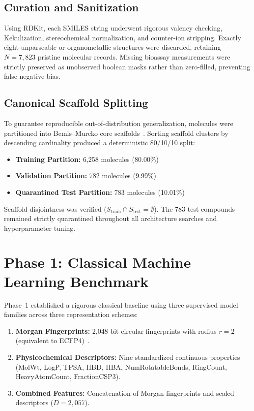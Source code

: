 \documentclass[conference]{IEEEtran}
\begin{document}
\subsection{Curation and Sanitization}
Using RDKit, each SMILES string underwent rigorous valency checking, Kekulization, stereochemical normalization, and counter-ion stripping. Exactly eight unparseable or organometallic structures were discarded, retaining $N = 7,823$ pristine molecular records. Missing bioassay measurements were strictly preserved as unobserved boolean masks rather than zero-filled, preventing false negative bias.

\subsection{Canonical Scaffold Splitting}
To guarantee reproducible out-of-distribution generalization, molecules were partitioned into Bemis--Murcko core scaffolds~\cite{bemis1996frameworks}. Sorting scaffold clusters by descending cardinality produced a deterministic 80/10/10 split:
\begin{itemize}
    \item \textbf{Training Partition:} 6,258 molecules (80.00\%)
    \item \textbf{Validation Partition:} 782 molecules (9.99\%)
    \item \textbf{Quarantined Test Partition:} 783 molecules (10.01\%)
\end{itemize}
Scaffold disjointness was verified ($S_{\text{train}} \cap S_{\text{test}} = \emptyset$). The 783 test compounds remained strictly quarantined throughout all architecture searches and hyperparameter tuning.

\section{Phase 1: Classical Machine Learning Benchmark}
Phase~1 established a rigorous classical baseline using three supervised model families across three representation schemes:
\begin{enumerate}
    \item \textbf{Morgan Fingerprints:} 2,048-bit circular fingerprints with radius $r=2$ (equivalent to ECFP4)~\cite{rogers2010ecfp}.
    \item \textbf{Physicochemical Descriptors:} Nine standardized continuous properties (MolWt, LogP, TPSA, HBD, HBA, NumRotatableBonds, RingCount, HeavyAtomCount, FractionCSP3).
    \item \textbf{Combined Features:} Concatenation of Morgan fingerprints and scaled descriptors ($D = 2,057$).
\end{enumerate}
\end{document}
